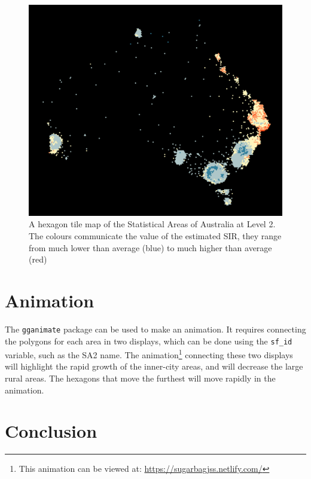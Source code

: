 \documentclass{monashthesis}
\begin{document}
\begin{figure}[H]
\centering
\includegraphics[width=16cm]{figures/03-algorithm/aus_melanoma_p_hex.pdf}
\caption{\label{fig:melanoma-hex}A hexagon tile map of the Statistical Areas of Australia at Level 2. The colours communicate the value of the estimated SIR, they range from much lower than average (blue) to much higher than average (red)}
\end{figure}

\hypertarget{animation}{%
\section{Animation}\label{animation}}

The \texttt{gganimate} \autocite{gganimate} package can be used to make an animation.
It requires connecting the polygons for each area in two displays, which can be done using the \texttt{sf\_id} variable, such as the SA2 name.
The animation\footnote{This animation can be viewed at: \url{https://sugarbagjss.netlify.com/}} connecting these two displays will highlight the rapid growth of the inner-city areas, and will decrease the large rural areas. The hexagons that move the furthest will move rapidly in the animation.

\hypertarget{conclusion}{%
\section{Conclusion}\label{conclusion}}
\end{document}

